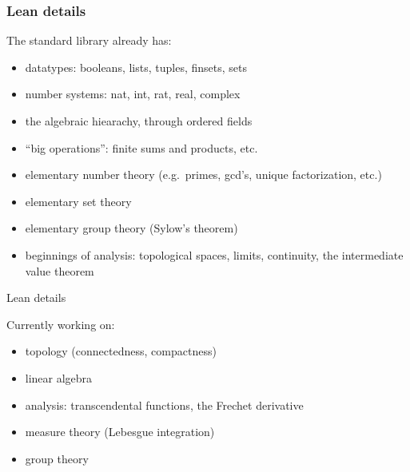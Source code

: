 \documentclass{beamer}
\begin{document}
\begin{frame}
 \frametitle{Lean details}
 The standard library already has:
\begin{itemize}
 \item datatypes: booleans, lists, tuples, finsets, sets
 \item number systems: nat, int, rat, real, complex
 \item the algebraic hiearachy, through ordered fields
 \item ``big operations'': finite sums and products, etc.
 \item elementary number theory (e.g.~primes, gcd's, unique factorization, etc.)
 \item elementary set theory
 \item elementary group theory (Sylow's theorem)
 \item beginnings of analysis: topological spaces, limits, continuity, the intermediate value theorem
\end{itemize}
\end{frame}

\begin{frame}{Lean details}
 
Currently working on:
\begin{itemize}
 \item topology (connectedness, compactness)
 \item linear algebra
 \item analysis: transcendental functions, the Frechet derivative
 \item measure theory (Lebesgue integration)
 \item group theory %
\end{itemize}

\end{frame}
\end{document}
